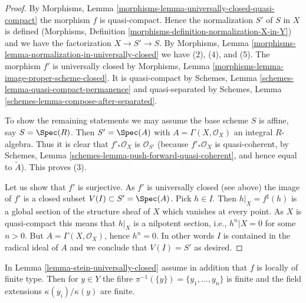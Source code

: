 \begin{proof}
By Morphisms, Lemma \ref{morphisms-lemma-universally-closed-quasi-compact}
the morphism $f$ is quasi-compact. Hence the normalization $S'$ of $S$ in
$X$ is defined (Morphisms, Definition
\ref{morphisms-definition-normalization-X-in-Y})
and we have the factorization $X \to S' \to S$. By
Morphisms, Lemma \ref{morphisms-lemma-normalization-in-universally-closed}
we have (2), (4), and (5). The morphism $f'$ is universally closed by
Morphisms, Lemma \ref{morphisms-lemma-image-proper-scheme-closed}.
It is quasi-compact by
Schemes, Lemma \ref{schemes-lemma-quasi-compact-permanence}
and quasi-separated by
Schemes, Lemma \ref{schemes-lemma-compose-after-separated}.

\medskip\noindent
To show the remaining statements we may assume the base scheme $S$ is affine,
say $S = \Spec(R)$. Then $S' = \Spec(A)$ with
$A = \Gamma(X, \mathcal{O}_X)$ an integral $R$-algebra.
Thus it is clear that $f'_*\mathcal{O}_X$
is $\mathcal{O}_{S'}$ (because $f'_*\mathcal{O}_X$ is quasi-coherent,
by
Schemes, Lemma
\ref{schemes-lemma-push-forward-quasi-coherent},
and hence equal to $\widetilde{A}$). This proves (3).

\medskip\noindent
Let us show that $f'$ is surjective. As $f'$ is universally closed (see above)
the image of $f'$ is a closed subset
$V(I) \subset S' = \Spec(A)$. Pick $h \in I$. Then
$h|_X = f^\sharp(h)$ is a global section of the structure sheaf of
$X$ which vanishes at every point. As $X$ is quasi-compact this means
that $h|_X$ is a nilpotent section, i.e., $h^n|X = 0$ for some $n > 0$.
But $A = \Gamma(X, \mathcal{O}_X)$, hence $h^n = 0$.
In other words $I$ is contained in the radical ideal of $A$ and we conclude
that $V(I) = S'$ as desired.
\end{proof}

\begin{lemma}
\label{lemma-stein-universally-closed-residue-fields}
In Lemma \ref{lemma-stein-universally-closed} assume in addition that
$f$ is locally of finite type. Then for $y \in Y$ the fibre
$\pi^{-1}(\{y\}) = \{y_1, \ldots, y_n\}$ is finite and the field extensions
$\kappa(y_i)/\kappa(y)$ are finite.
\end{lemma}

